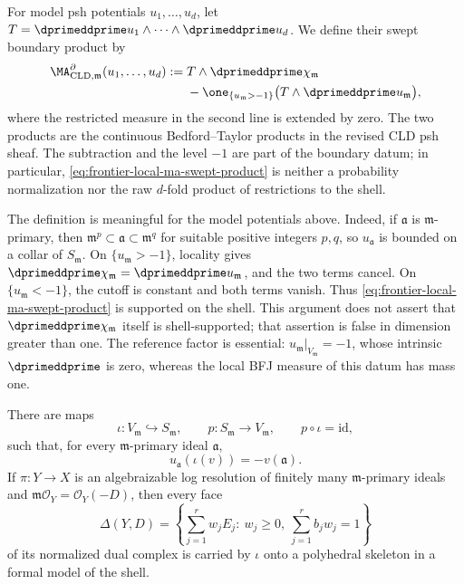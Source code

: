 For model psh potentials \(u_1,\ldots,u_d\), let
\(T=\dprimeddprime u_1\wedge\cdots\wedge\dprimeddprime u_d\).  We define
their swept boundary product by
\begin{equation}
 \begin{split}
 \MA^{\partial}_{\mathrm{CLD},\mathfrak m}
       (u_1,\ldots,u_d)
 :={}&T\wedge\dprimeddprime\chi_{\mathfrak m}\\
 &-\one_{\{u_{\mathfrak m}>-1\}}
       \bigl(T\wedge\dprimeddprime u_{\mathfrak m}\bigr),
 \end{split}
 \label{eq:frontier-local-ma-swept-product}
\end{equation}
where the restricted measure in the second line is extended by zero.  The
two products are the continuous Bedford--Taylor products in the revised CLD
psh sheaf.  The subtraction and the level \(-1\) are part of the boundary
datum; in particular, \eqref{eq:frontier-local-ma-swept-product} is neither a
probability normalization nor the raw \(d\)-fold product of restrictions to
the shell.

The definition is meaningful for the model potentials above.  Indeed, if
\(\mathfrak a\) is \(\mathfrak m\)-primary, then
\(\mathfrak m^p\subset\mathfrak a\subset\mathfrak m^q\) for suitable
positive integers \(p,q\), so \(u_{\mathfrak a}\) is bounded on a collar of
\(S_{\mathfrak m}\).  On \(\{u_{\mathfrak m}>-1\}\), locality gives
\(\dprimeddprime\chi_{\mathfrak m}
=\dprimeddprime u_{\mathfrak m}\), and the two terms cancel.  On
\(\{u_{\mathfrak m}<-1\}\), the cutoff is constant and both terms vanish.
Thus \eqref{eq:frontier-local-ma-swept-product} is supported on the shell.
This argument does not assert that
\(\dprimeddprime\chi_{\mathfrak m}\) itself is shell-supported; that
assertion is false in dimension greater than one.  The reference factor is
essential: \(u_{\mathfrak m}|_{V_{\mathfrak m}}=-1\), whose intrinsic
\(\dprimeddprime\) is zero, whereas the local BFJ measure of this datum has
mass one.

\begin{lemma}\label{lem:frontier-local-ma-gauss}
There are maps
\[
 \iota:V_{\mathfrak m}\hookrightarrow S_{\mathfrak m},
 \qquad
 p:S_{\mathfrak m}\longrightarrow V_{\mathfrak m},
 \qquad p\circ\iota=\mathrm{id},
\]
such that, for every \(\mathfrak m\)-primary ideal \(\mathfrak a\),
\begin{equation}
             u_{\mathfrak a}(\iota(v))=-v(\mathfrak a).
 \label{eq:frontier-local-ma-gauss-ideal}
\end{equation}
If \(\pi:Y\to X\) is an algebraizable log resolution of finitely many
\(\mathfrak m\)-primary ideals and
\(\mathfrak m\mathcal O_Y=\mathcal O_Y(-D)\), then every face
\begin{equation}
 \Delta(Y,D)=
 \left\{\sum_{j=1}^r w_jE_j:\ w_j\geq0,
                       \ \sum_{j=1}^r b_jw_j=1\right\}
 \label{eq:frontier-local-ma-dual-face}
\end{equation}
of its normalized dual complex is carried by \(\iota\) onto a polyhedral
skeleton in a formal model of the shell.
\end{lemma}

